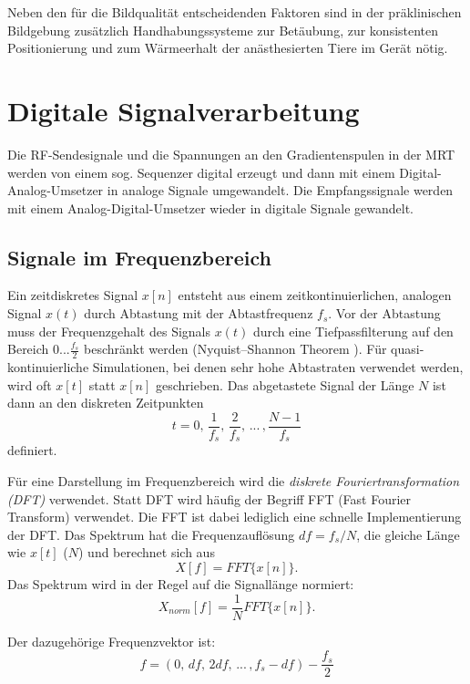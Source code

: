 Neben den für die Bildqualität entscheidenden Faktoren sind in der präklinischen Bildgebung zusätzlich Handhabungssysteme zur Betäubung, zur konsistenten Positionierung und zum Wärmeerhalt der anästhesierten Tiere im Gerät nötig.




\section{Digitale Signalverarbeitung}
Die RF-Sendesignale und die Spannungen an den Gradientenspulen in der MRT werden von einem sog. Sequenzer digital erzeugt und dann mit einem Digital-Analog-Umsetzer in analoge Signale umgewandelt. Die Empfangssignale werden mit einem Analog-Digital-Umsetzer wieder in digitale Signale gewandelt.

\subsection{Signale im Frequenzbereich}
Ein zeitdiskretes Signal $x[n]$ entsteht aus einem zeitkontinuierlichen, analogen Signal $x(t)$ durch Abtastung mit der Abtastfrequenz $f_s$. Vor der Abtastung muss der Frequenzgehalt des Signals $x(t)$ durch eine Tiefpassfilterung auf den Bereich $0...\frac{f_s}{2}$ beschränkt werden (Nyquist–Shannon Theorem \cite{Shannon1949}).
Für quasi-kontinuierliche Simulationen, bei denen sehr hohe Abtastraten verwendet werden, wird oft $x[t]$ statt $x[n]$ geschrieben. Das abgetastete Signal der Länge $N$ ist dann an den diskreten Zeitpunkten
\begin{equation}
	t=0,\,\frac{1}{f_s},\,\frac{2}{f_s},\,...\,,\frac{N-1}{f_s}
\end{equation}
definiert.

Für eine Darstellung im Frequenzbereich wird die \textit{diskrete Fouriertransformation (DFT)} verwendet. Statt DFT wird häufig der Begriff FFT (Fast Fourier Transform) verwendet. Die FFT ist dabei lediglich eine schnelle Implementierung der DFT.
Das Spektrum hat die Frequenzauflösung $df=f_s/N$, die gleiche Länge wie $x[t]$ ($N$) und berechnet sich aus 
\begin{equation}
	X[f]=FFT\{x[n]\}.
\end{equation}
Das Spektrum wird in der Regel auf die Signallänge normiert:
\begin{equation}
X_{norm}[f]=\frac{1}{N} FFT\{x[n]\}.
\end{equation}

Der dazugehörige Frequenzvektor ist:
\begin{equation}
	f=(0,\, df,\, 2df,\, ...\,, f_s-df)-\frac{f_s}{2}
\end{equation}

